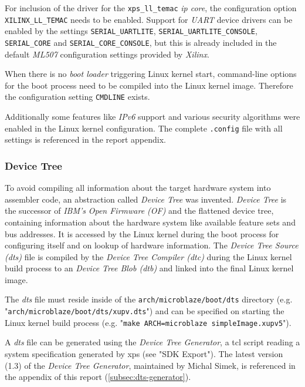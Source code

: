 For inclusion of the driver for the \texttt{xps\_ll\_temac} \textit{\gls{ip} core}, the configuration option \texttt{XILINX\_LL\_TEMAC} needs to be enabled. Support for \textit{UART} device drivers can be enabled by the settings \texttt{SERIAL\_UARTLITE}, \texttt{SERIAL\_UARTLITE\_CONSOLE}, \texttt{SERIAL\_CORE} and \texttt{SERIAL\_CORE\_CONSOLE}, but this is already included in the default \textit{ML507} configuration settings provided by \textit{Xilinx}.

When there is no \textit{boot loader} triggering Linux kernel start, command-line options for the boot process need to be compiled into the Linux kernel image. Therefore the configuration setting \texttt{CMDLINE} exists.

Additionally some features like \textit{IPv6} support and various security algorithms were enabled in the Linux kernel configuration. The complete \texttt{.config} file with all settings is referenced in the report appendix.

\subsubsection{Device Tree}
\label{subsubsec:device_tree}

To avoid compiling all information about the target hardware system into assembler code, an abstraction called \textit{Device Tree} was invented. \textit{Device Tree} is the successor of \textit{IBM's} \textit{Open Firmware (OF)} and the flattened device tree, containing information about the hardware system like available feature sets and bus addresses. \cite{device_tree} It is accessed by the Linux kernel during the boot process for configuring itself and on lookup of hardware information. The \textit{Device Tree Source (dts)} file is compiled by the \textit{Device Tree Compiler (dtc)} during the Linux kernel build process to an \textit{Device Tree Blob (dtb)} and linked into the final Linux kernel image.

The \textit{dts} file must reside inside of the \texttt{arch/microblaze/boot/dts} directory (e.g. "\texttt{arch/microblaze/boot/dts/xupv.dts}") and can be specified on starting the Linux kernel build process (e.g. "\texttt{make ARCH=microblaze simpleImage.xupv5}").

A \textit{dts} file can be generated using the \textit{Device Tree Generator}, a \gls{tcl} script reading a system specification generated by \gls{xps} (see "SDK Export"). The latest version (1.3) of the \textit{Device Tree Generator}, maintained by Michal Simek, is referenced in the appendix of this report (\ref{subsec:dts-generator}).

